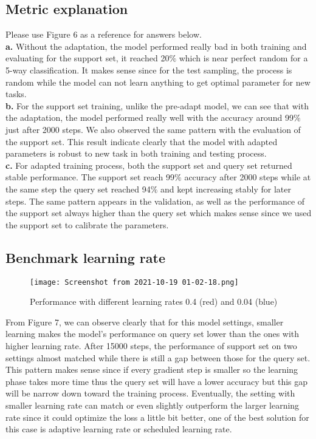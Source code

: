 \documentclass[]{article}
\begin{document}
	\subsection{Metric explanation}
	Please use Figure 6 as a reference for answers below. \\
	\textbf{a.}
	Without the adaptation, the model performed really bad in both training and evaluating for the support set, it reached 20$\%$ which is near perfect random for a 5-way classification. It makes sense since for the test sampling, the process is random while the model can not learn anything to get optimal parameter for new tasks. \\
	\textbf{b.}
	For the support set training, unlike the pre-adapt model, we can see that with the adaptation, the model performed really well with the accuracy around 99$\%$ just after 2000 steps. We also observed the same pattern with the evaluation of the support set. This result indicate clearly that the model with adapted parameters is robust to new task in both training and testing process. \\
	\textbf{c.}
	For adapted training process, both the support set and query set returned stable performance. The support set reach 99$\%$ accuracy after 2000 steps while at the same step the query set reached 94$\%$ and kept increasing stably for later steps. The same pattern appears in the validation, as well as the performance of the support set always higher than the query set which makes sense since we used the support set to calibrate the parameters. \\
	
	\subsection{Benchmark learning rate}
	\begin{center} 
		\begin{figure}[H]
			\centering
			\texttt{[image: Screenshot from 2021-10-19 01-02-18.png]}
			\caption{Performance with different learning rates 0.4 (red) and 0.04 (blue)}
		\end{figure}
	\end{center}
	From Figure 7, we can observe clearly that for this model settings, smaller learning makes the model's performance on query set lower than the ones with higher learning rate. After 15000 steps, the performance of support set on two settings almost matched while there is still a gap between those for the query set. This pattern makes sense since if every gradient step is smaller so the learning phase takes more time thus the query set will have a lower accuracy but this gap will be narrow down toward the training process. Eventually, the setting with smaller learning rate can match or even slightly outperform the larger learning rate since it could optimize the loss a little bit better, one of the best solution for this case is adaptive learning rate or scheduled learning rate.
	
\end{document}
